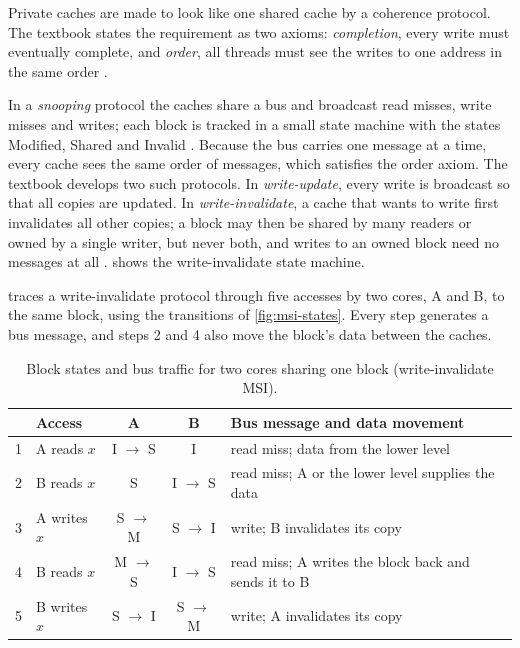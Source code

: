 Private caches are made to look like one shared cache by a coherence protocol. The textbook states the requirement as two axioms: \emph{completion}, every write must eventually complete, and \emph{order}, all threads must see the writes to one address in the same order \cite[sec.~12.4.2]{sarangi2025basic}.

In a \emph{snooping} protocol the caches share a bus and broadcast read misses, write misses and writes; each block is tracked in a small state machine with the states Modified, Shared and Invalid \cite[sec.~12.4.6]{sarangi2025basic}. Because the bus carries one message at a time, every cache sees the same order of messages, which satisfies the order axiom. The textbook develops two such protocols. In \emph{write-update}, every write is broadcast so that all copies are updated. In \emph{write-invalidate}, a cache that wants to write first invalidates all other copies; a block may then be shared by many readers or owned by a single writer, but never both, and writes to an owned block need no messages at all \cite[sec.~12.4.6]{sarangi2025basic}.  shows the write-invalidate state machine.



 traces a write-invalidate protocol through five accesses by two cores, A and B, to the same block, using the transitions of \cref{fig:msi-states}. Every step generates a bus message, and steps 2 and 4 also move the block's data between the caches.

\begin{table}[htbp]
  \centering
  \caption[Block states and bus traffic for two cores sharing one block]{Block states and bus traffic for two cores sharing one block (write-invalidate MSI).}
  \label{tab:msi-example}
  \small
  \begin{tabularx}{\textwidth}{@{}l>{\raggedright\arraybackslash}p{2.5cm}cc>{\raggedright\arraybackslash}X@{}}
    \toprule
    & \textbf{Access} & \textbf{A} & \textbf{B} & \textbf{Bus message and data movement} \\
    \midrule
    1 & A reads $x$ & I $\to$ S & I & read miss; data from the lower level \\
    2 & B reads $x$ & S & I $\to$ S & read miss; A or the lower level supplies the data \\
    3 & A writes $x$ & S $\to$ M & S $\to$ I & write; B invalidates its copy \\
    4 & B reads $x$ & M $\to$ S & I $\to$ S & read miss; A writes the block back and sends it to B \\
    5 & B writes $x$ & S $\to$ I & S $\to$ M & write; A invalidates its copy \\
    \bottomrule
  \end{tabularx}
\end{table}

